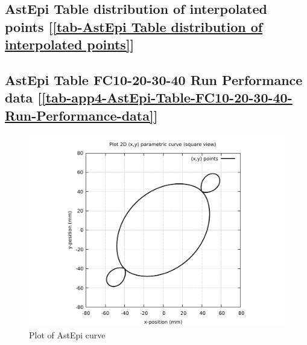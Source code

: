 \subsection    {AstEpi Table distribution of interpolated points
	[\ref      {tab-AstEpi Table distribution of interpolated points}] }
\label{ssec-tab-AstEpi Table distribution of interpolated points}

\subsection         {AstEpi Table FC10-20-30-40 Run Performance data
	[\ref      {tab-app4-AstEpi-Table-FC10-20-30-40-Run-Performance-data}] }
\label{ssec-tab-app4-AstEpi-Table-FC10-20-30-40-Run-Performance-data}


\clearpage
\pagebreak

\begin{figure}
	\caption     {Plot of AstEpi curve}
	\label{01-img-Plot of AstEpi curve.pdf}
\includegraphics[width=1.00\textwidth]{Chap4/appendix/app-AstEpi/plots/01-img-Plot of AstEpi curve.pdf}
\end{figure}	


